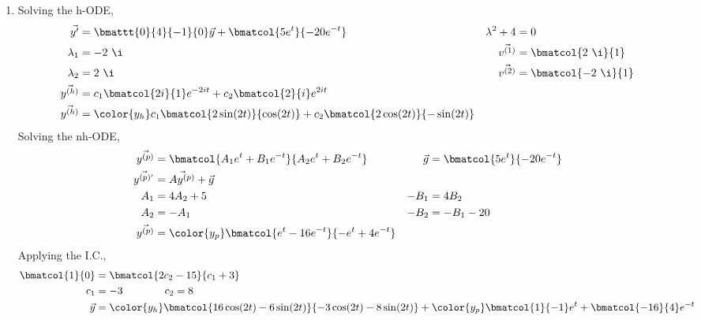 \begin{enumerate}
    \item Solving the h-ODE,
          \begin{align}
              \vec{y'}                    & = \bmattt{0}{4}{-1}{0} \vec{y}
              + \bmatcol{5e^t}{-20e^{-t}} &
              \lambda^{2} + 4             & = 0                              \\
              \lambda_1                   & = -2\ \i                       &
              \vec{v^{(1)}}               & = \bmatcol{2\ \i}{1}             \\
              \lambda_2                   & = 2\ \i                        &
              \vec{v^{(2)}}               & = \bmatcol{-2\ \i}{1}            \\
              \vec{y^{(h)}}               & = c_1 \bmatcol{2i}{1}e^{-2it}
              + c_2 \bmatcol{2}{i} e^{2it}                                   \\
              \vec{y^{(h)}}               & = \color{y_h}
              c_1 \bmatcol{2\sin(2t)}{\cos(2t)}
              + c_2 \bmatcol{2\cos(2t)}{-\sin(2t)}
          \end{align}
          Solving the nh-ODE,
          \begin{align}
              \vec{y^{(p)}}            & = \bmatcol{A_1 e^{t} + B_1 e^{-t}}
              {A_2 e^{t} + B_2 e^{-t}} &
              \vec{g}                  & = \bmatcol{5 e^{t}}{-20 e^{-t}}      \\
              \vec{y^{(p)'}}           & = \vec{Ay^{(p)}} + \vec{g}           \\
              A_1                      & = 4A_2 + 5                         &
              -B_1                     & = 4B_2                               \\
              A_2                      & = -A_1                             &
              -B_2                     & = -B_1 - 20                          \\
              \vec{y^{(p)}}            & = \color{y_p}
              \bmatcol{e^t - 16e^{-t}}{-e^{t} + 4e^{-t}}
          \end{align}
          Applying the I.C.,
          \begin{align}
              \bmatcol{1}{0} & = \bmatcol{2c_2 - 15}{c_1 + 3} \\
              c_1            & = -3 \qquad\qquad c_2 = 8      \\
              \vec{y}        & = {\color{y_h}
              \bmatcol{16\cos(2t) - 6\sin(2t)}{-3\cos(2t) - 8\sin(2t)}}
              + {\color{y_p} \bmatcol{1}{-1}e^{t}
              + \bmatcol{-16}{4}e^{-t}}
          \end{align}


\end{enumerate}
